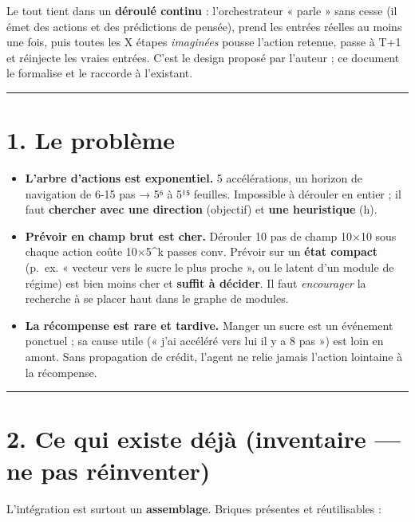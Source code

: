 \documentclass[
  french,
  11pt,
]{article}
\providecommand{\tightlist}{%
  \setlength{\itemsep}{0pt}\setlength{\parskip}{0pt}}
\begin{document}
Le tout tient dans un \textbf{déroulé continu} : l'orchestrateur « parle
» sans cesse (il émet des actions et des prédictions de pensée), prend
les entrées réelles au moins une fois, puis toutes les X étapes
\emph{imaginées} pousse l'action retenue, passe à T+1 et réinjecte les
vraies entrées. C'est le design proposé par l'auteur ; ce document le
formalise et le raccorde à l'existant.

\begin{center}\rule{0.5\linewidth}{0.5pt}\end{center}

\section{1. Le problème}\label{le-probluxe8me}

\begin{itemize}
\tightlist
\item
  \textbf{L'arbre d'actions est exponentiel.} 5 accélérations, un
  horizon de navigation de 6-15 pas → 5⁶ à 5¹⁵ feuilles. Impossible à
  dérouler en entier ; il faut \textbf{chercher avec une direction}
  (objectif) et \textbf{une heuristique} (h).
\item
  \textbf{Prévoir en champ brut est cher.} Dérouler 10 pas de champ
  10×10 sous chaque action coûte 10×5\^{}k passes conv. Prévoir sur un
  \textbf{état compact} (p.~ex. « vecteur vers le sucre le plus proche
  », ou le latent d'un module de régime) est bien moins cher et
  \textbf{suffit à décider}. Il faut \emph{encourager} la recherche à se
  placer haut dans le graphe de modules.
\item
  \textbf{La récompense est rare et tardive.} Manger un sucre est un
  événement ponctuel ; sa cause utile (« j'ai accéléré vers lui il y a 8
  pas ») est loin en amont. Sans propagation de crédit, l'agent ne relie
  jamais l'action lointaine à la récompense.
\end{itemize}

\begin{center}\rule{0.5\linewidth}{0.5pt}\end{center}

\section{2. Ce qui existe déjà (inventaire --- ne pas
réinventer)}\label{ce-qui-existe-duxe9juxe0-inventaire-ne-pas-ruxe9inventer}

L'intégration est surtout un \textbf{assemblage}. Briques présentes et
réutilisables :
\end{document}
